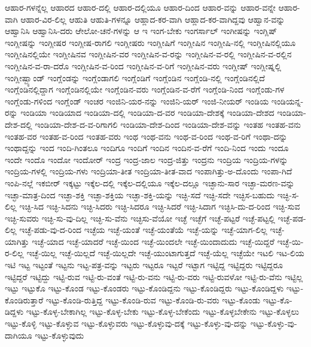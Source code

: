 {ಆಹಾರ-ಗಳನ್ನೆಲ್ಲ
ಆಹಾರದ
ಆಹಾರ-ದಲ್ಲಿ
ಆಹಾರ-ದಲ್ಲಿಯೂ
ಆಹಾರ-ದಿಂದ
ಆಹಾರ-ವನ್ನು
ಆಹಾರ-ವನ್ನೇ
ಆಹಾರ-ವಾಗಿ
ಆಹಾರ-ವಿರ-ಲಿಲ್ಲ
ಆಹುತಿ
ಆಹುತಿ-ಗಳನ್ನೂ
ಆಹ್ಲಾದ-ಕರ-ವಾಗಿ
ಆಹ್ಲಾದ-ಕರ-ವಾಗಿದ್ದವು
ಆಹ್ವಾನ-ವನ್ನು
ಆಹ್ವಾನಿಸಿ
ಆಹ್ವಾನಿಸಿ-ದರು
ಆೇಲೋ-ಚನೆ-ಗಳನ್ನು
ಆ
ಇ
ಇಂಗ-ಬೇಕು
ಇಂಗರ್ಸಾಲ್
ಇಂಗೀಷನ್ನು
ಇಂಗ್ಲಿಷ್
ಇಂಗ್ಲೀಷನ್ನು
ಇಂಗ್ಲೀಷರ
ಇಂಗ್ಲೀಷ-ರಾಗಲಿ
ಇಂಗ್ಲೀಷರು
ಇಂಗ್ಲೀಷಿಗೆ
ಇಂಗ್ಲೀಷಿನ
ಇಂಗ್ಲೀಷಿ-ನಲ್ಲಿ
ಇಂಗ್ಲೀಷಿನಲ್ಲಿಯೂ
ಇಂಗ್ಲೀಷಿನಲ್ಲಿಯೇ
ಇಂಗ್ಲೀಷಿನವ
ಇಂಗ್ಲೀಷಿನ-ವರ
ಇಂಗ್ಲೀಷಿನ-ವ-ರನ್ನು
ಇಂಗ್ಲೀಷಿನ-ವ-ರಲ್ಲಿ
ಇಂಗ್ಲೀಷಿನ-ವ-ರಲ್ಲಿನ
ಇಂಗ್ಲೀಷಿನ-ವ-ರಾ-ದರೊ
ಇಂಗ್ಲೀಷಿನ-ವ-ರಿಂದ
ಇಂಗ್ಲೀಷಿನ-ವ-ರಿಗೆ
ಇಂಗ್ಲೀಷಿನ-ವರು
ಇಂಗ್ಲೀಷ್
ಇಂಗ್ಲೀಷ್ನಲ್ಲಿ
ಇಂಗ್ಲೀಷ್ಬ್ಯಾಂಡ್
ಇಂಗ್ಲೆಂಡನ್ನು
ಇಂಗ್ಲೆಂಡಾಗಲಿ
ಇಂಗ್ಲೆಂಡಿಗೆ
ಇಂಗ್ಲೆಂಡಿನ
ಇಂಗ್ಲೆಂಡಿ-ನಲ್ಲಿ
ಇಂಗ್ಲೆಂಡಿನಲ್ಲಿದೆ
ಇಂಗ್ಲೆಂಡಿನಲ್ಲಿದ್ದಾಗ
ಇಂಗ್ಲೆಂಡಿನಲ್ಲಿಯೇ
ಇಂಗ್ಲೆಂಡಿನ-ವರು
ಇಂಗ್ಲೆಂಡಿನ-ವ-ರೆಗೆ
ಇಂಗ್ಲೆಂಡಿ-ನಿಂದ
ಇಂಗ್ಲೆಂಡು-ಗಳ
ಇಂಗ್ಲೆಂಡು-ಗಳಿಂದ
ಇಂಗ್ಲೆಂಡ್
ಇಂಚರ
ಇಂಜಿನಿ-ಯರ-ನನ್ನು
ಇಂಜಿನಿ-ಯರ್
ಇಂಜಿ-ನೀಯರ್
ಇಂಡಿಯ
ಇಂಡಿಯನ್ನ-ರನ್ನು
ಇಂಡಿಯಾ
ಇಂಡಿಯಾದ
ಇಂಡಿಯಾ-ದಲ್ಲಿ
ಇಂಡಿಯಾ-ದ-ವರ
ಇಂಡಿಯಾ-ದೇಶಕ್ಕೆ
ಇಂಡಿಯಾ-ದೇಶದ
ಇಂಡಿಯಾ-ದೇಶ-ದಲ್ಲಿ
ಇಂಡಿಯಾ-ದೇಶ-ದ-ವ-ರಿಗಾಗಲಿ
ಇಂಡಿಯಾ-ದೇಶ-ದಿಂದ
ಇಂಡಿಯಾ-ದೇಶ-ವನ್ನು
ಇಂತಹ
ಇಂತಹ-ವನು
ಇಂತಹ-ವರ
ಇಂತಹ-ವ-ರಿಂದ
ಇಂತಹ-ವರು
ಇಂಥ
ಇಂಥ-ವನು
ಇಂಥ-ವ-ರಿಂದ
ಇಂಥ-ವ-ರಿಗೆ
ಇಂಥಾ-ದನ್ನು
ಇಂಥಾದ್ದನ್ನು
ಇಂದ
ಇಂದಿ-ಗಿಂತಲೂ
ಇಂದಿಗೂ
ಇಂದಿಗೆ
ಇಂದಿನ
ಇಂದಿನ-ವ-ರೆಗೆ
ಇಂದಿ-ನಿಂದ
ಇಂದು
ಇಂದೂ
ಇಂದೇ
ಇಂದೊ
ಇಂದೋ
ಇಂದೋರ್
ಇಂದ್ರ
ಇಂದ್ರ-ಜಾಲ
ಇಂದ್ರ-ಜಿತ್ತು
ಇಂದ್ರನು
ಇಂದ್ರಿಯ
ಇಂದ್ರಿಯ-ಗಳನ್ನು
ಇಂದ್ರಿಯ-ಗಳಲ್ಲಿ
ಇಂದ್ರಿಯ-ಗಳು
ಇಂದ್ರಿಯಾ-ತೀತ
ಇಂದ್ರಿಯಾ-ತೀತ-ವಾದ
ಇಂಪಾಗಿತ್ತು-ಅ-ದೊಂದು
ಇಂಪಾ-ಗಿದೆ
ಇಂಪಿ-ನಲ್ಲೆ
ಇಕಬೀರ್
ಇಕ್ಕಟ್ಟು
ಇಕ್ಕೆಲ-ದಲ್ಲಿ
ಇಕ್ಕೆಲ-ದಲ್ಲಿಯೂ
ಇಕ್ಕೆಲ-ದಲ್ಲೂ
ಇಚ್ಛಾನು-ಸಾರ
ಇಚ್ಛಾ-ಮರಣ-ವನ್ನು
ಇಚ್ಛಾ-ಮಾತ್ರ-ದಿಂದ
ಇಚ್ಛಾ-ಶಕ್ತಿ
ಇಚ್ಛಾ-ಶಕ್ತಿಯ
ಇಚ್ಛಾ-ಶಕ್ತಿ-ಯನ್ನು
ಇಚ್ಛಿ-ಸದೆ
ಇಚ್ಛಿ-ಸದೇ
ಇಚ್ಛಿಸ-ಬಹುದು
ಇಚ್ಛಿ-ಸ-ಲಿಲ್ಲ
ಇಚ್ಛಿ-ಸಿದ
ಇಚ್ಛಿ-ಸಿದನು
ಇಚ್ಛಿ-ಸಿದರು
ಇಚ್ಛಿ-ಸಿದರೂ
ಇಚ್ಛಿ-ಸಿದರೆ
ಇಚ್ಛಿ-ಸಿದಾಗ
ಇಚ್ಛಿಸಿ-ದು-ದ-ರಿಂದ
ಇಚ್ಛಿ-ಸುವ
ಇಚ್ಛಿ-ಸುವರು
ಇಚ್ಛಿ-ಸು-ವು-ದಿಲ್ಲ
ಇಚ್ಛಿ-ಸು-ವೆನು
ಇಚ್ಛಿಸು-ವೆಯೋ
ಇಚ್ಛೆ
ಇಚ್ಛೆಗೆ
ಇಚ್ಛೆ-ಪಟ್ಟರೆ
ಇಚ್ಛೆ-ಪಟ್ಟಲ್ಲಿ
ಇಚ್ಛೆ-ಪಡ-ಲಿಲ್ಲ
ಇಚ್ಛೆ-ಪಡು-ವು-ದ-ರಿಂದ
ಇಚ್ಛೆಯ
ಇಚ್ಛೆ-ಯಂತೆ
ಇಚ್ಛೆ-ಯಂತೆಯೆ
ಇಚ್ಛೆ-ಯನ್ನು
ಇಚ್ಛೆ-ಯಾಗ-ಲಿಲ್ಲ
ಇಚ್ಛೆ-ಯಾಗಿತ್ತು
ಇಚ್ಛೆ-ಯಾದ
ಇಚ್ಛೆ-ಯಾದರೆ
ಇಚ್ಛೆ-ಯಿಂದ
ಇಚ್ಛೆ-ಯಿಂದಲೇ
ಇಚ್ಛೆ-ಯಿಂದಾದುದು
ಇಚ್ಛೆ-ಯಿದ್ದರೆ
ಇಚ್ಛೆ-ಯಿ-ರ-ಲಿಲ್ಲ
ಇಚ್ಛೆ-ಯಿಲ್ಲ
ಇಚ್ಛೆ-ಯಿಲ್ಲದೆ
ಇಚ್ಛೆ-ಯಿಲ್ಲದೇ
ಇಚ್ಛೆ-ಯುಂಟಾಗುತ್ತದೆ
ಇಚ್ಛೆ-ಯೆಲ್ಲ
ಇಚ್ಛೆಯೇ
ಇಟಲಿ
ಇಟ-ಲಿಯ
ಇಟಿ
ಇಟ್ಟ
ಇಟ್ಟಂತೆ
ಇಟ್ಟನು
ಇಟ್ಟ-ಪತ್ರ-ವನ್ನು
ಇಟ್ಟರು
ಇಟ್ಟರೂ
ಇಟ್ಟರೆ
ಇಟ್ಟಾಗ
ಇಟ್ಟಿದ್ದ
ಇಟ್ಟಿದ್ದರು
ಇಟ್ಟಿದ್ದರೂ
ಇಟ್ಟಿದ್ದರೆ
ಇಟ್ಟಿದ್ದು
ಇಟ್ಟಿ-ರುವ
ಇಟ್ಟಿ-ರು-ವಂತೆ
ಇಟ್ಟಿ-ರು-ವನು
ಇಟ್ಟಿ-ರು-ವರು
ಇಟ್ಟಿ-ರುವಳೋ
ಇಟ್ಟಿ-ರು-ವೆನು
ಇಟ್ಟಿಲ್ಲ
ಇಟ್ಟು
ಇಟ್ಟುಕೊ
ಇಟ್ಟು-ಕೊಂಡ
ಇಟ್ಟು-ಕೊಂಡರು
ಇಟ್ಟು-ಕೊಂಡಿದ್ದನು
ಇಟ್ಟು-ಕೊಂಡಿದ್ದರು
ಇಟ್ಟು-ಕೊಂಡಿದ್ದಳು
ಇಟ್ಟು-ಕೊಂಡಿರುತ್ತಾರೆ
ಇಟ್ಟು-ಕೊಂಡಿ-ರುತ್ತಿದ್ದ
ಇಟ್ಟು-ಕೊಂಡಿ-ರುವ
ಇಟ್ಟು-ಕೊಂಡಿ-ರು-ವರು
ಇಟ್ಟು-ಕೊಂಡು
ಇಟ್ಟು-ಕೊ-ಡಿದ್ದಳು
ಇಟ್ಟು-ಕೊಳ್ಳ-ಬೇಕಾಗಿಲ್ಲ
ಇಟ್ಟು-ಕೊಳ್ಳ-ಬೇಕು
ಇಟ್ಟು-ಕೊಳ್ಳ-ಬೇಕೆಂದು
ಇಟ್ಟು-ಕೊಳ್ಳಬೇಕೇನು
ಇಟ್ಟು-ಕೊಳ್ಳಲು
ಇಟ್ಟು-ಕೊಳ್ಳಿ
ಇಟ್ಟು-ಕೊಳ್ಳುವ
ಇಟ್ಟು-ಕೊಳ್ಳುವರು
ಇಟ್ಟು-ಕೊಳ್ಳುವು-ದಕ್ಕೆ
ಇಟ್ಟು-ಕೊಳ್ಳು-ವು-ದನ್ನು
ಇಟ್ಟು-ಕೊಳ್ಳು-ವು-ದಾಗಿಯೂ
ಇಟ್ಟು-ಕೊಳ್ಳುವುದು
}
